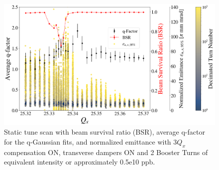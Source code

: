 \begin{figure}[H]
    \centering
    \includegraphics[width=\columnwidth]{chapter6/static2turns_emittance_dampersON.png}
    \caption{Static tune scan with beam survival ratio (BSR), average q-factor for the q-Gaussian fits, and normalized emittance with $3Q_x$ compensation ON, transverse dampers ON and 2 Booster Turns of equivalent intensity or approximately 0.5e10 ppb.}
    \label{fig:static2_scatter_dampersON}
\end{figure}